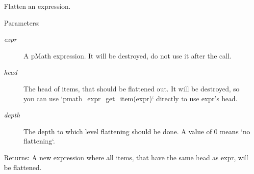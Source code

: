 Flatten an expression. 

\begin{Desc}
\item[Parameters:]
\begin{description}
\item[{\em expr}]A pMath expression. It will be destroyed, do not use it after the call. \item[{\em head}]The head of items, that should be flattened out. It will be destroyed, so you can use `pmath\_\-expr\_\-get\_\-item(expr)` directly to use expr's head. \item[{\em depth}]The depth to which level flattening should be done. A value of 0 means `no flattening`. \end{description}
\end{Desc}
\begin{Desc}
\item[Returns:]A new expression where all items, that have the same head as expr, will be flattened. \end{Desc}
